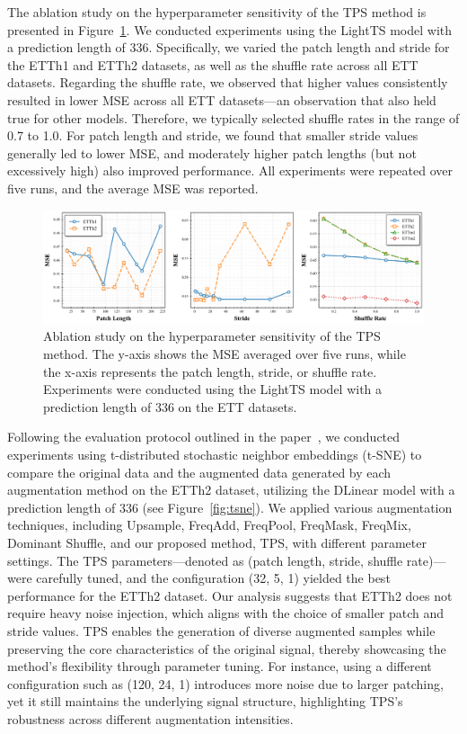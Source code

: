 The ablation study on the hyperparameter sensitivity of the TPS method is presented in Figure~\ref{fig:ablation_lightts}. We conducted experiments using the LightTS model with a prediction length of 336. Specifically, we varied the patch length and stride for the ETTh1 and ETTh2 datasets, as well as the shuffle rate across all ETT datasets. Regarding the shuffle rate, we observed that higher values consistently resulted in lower MSE across all ETT datasets—an observation that also held true for other models. Therefore, we typically selected shuffle rates in the range of 0.7 to 1.0. For patch length and stride, we found that smaller stride values generally led to lower MSE, and moderately higher patch lengths (but not excessively high) also improved performance. All experiments were repeated over five runs, and the average MSE was reported.

\begin{figure}[htbp]
    \centering
\includegraphics[page=1, width=1.0\textwidth, keepaspectratio]{./images/ablation_study_colorful.pdf}
\caption{Ablation study on the hyperparameter sensitivity of the TPS method. The y-axis shows the MSE averaged over five runs, while the x-axis represents the patch length, stride, or shuffle rate. Experiments were conducted using the LightTS model with a prediction length of 336 on the ETT datasets.}
    \label{fig:ablation_lightts}
\end{figure}


Following the evaluation protocol outlined in the paper~\cite{zhao2024dominantshufflesimplepowerful}, we conducted experiments using t-distributed stochastic neighbor embeddings (t-SNE) to compare the original data and the augmented data generated by each augmentation method on the ETTh2 dataset, utilizing the DLinear model with a prediction length of 336 (see Figure~\ref{fig:tsne}). We applied various augmentation techniques, including Upsample, FreqAdd, FreqPool, FreqMask, FreqMix, Dominant Shuffle, and our proposed method, TPS, with different parameter settings. The TPS parameters—denoted as (patch length, stride, shuffle rate)—were carefully tuned, and the configuration (32, 5, 1) yielded the best performance for the ETTh2 dataset. Our analysis suggests that ETTh2 does not require heavy noise injection, which aligns with the choice of smaller patch and stride values. TPS enables the generation of diverse augmented samples while preserving the core characteristics of the original signal, thereby showcasing the method's flexibility through parameter tuning. For instance, using a different configuration such as (120, 24, 1) introduces more noise due to larger patching, yet it still maintains the underlying signal structure, highlighting TPS's robustness across different augmentation intensities.



